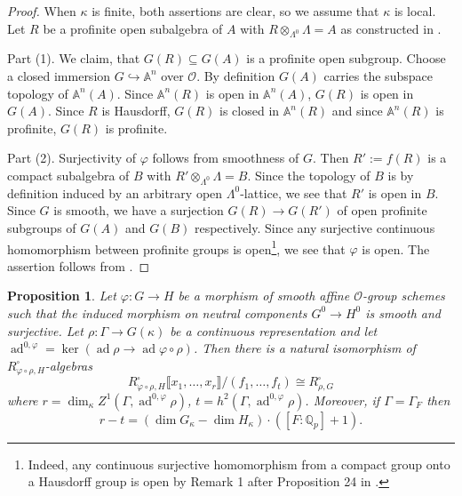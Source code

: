 \documentclass{amsart}
\newtheorem{prop}{Proposition}[section]
\theoremstyle{definition}
\theoremstyle{remark}
\newcommand{\Qp}{\mathbb {Q}_p}
\newcommand{\OO}{\mathcal O}
\DeclareMathOperator{\ad}{ad}
\newcommand{\br}[1]{\llbracket #1\rrbracket}
\begin{document}
\begin{proof} When $\kappa$ is finite, both assertions are clear, so we assume that $\kappa$ is local. Let $R$ be a profinite open subalgebra of $A$ with $R \otimes_{\Lambda^0} \Lambda = A$ as constructed in .

Part (1). We claim, that $G(R) \subseteq G(A)$ is a profinite open subgroup. Choose a closed immersion $G \hookrightarrow \mathbb A^n$ over $\OO$. By definition $G(A)$ carries the subspace topology of $\mathbb A^n(A)$. Since $\mathbb A^n(R)$ is open in $\mathbb A^n(A)$, $G(R)$ is open in $G(A)$. Since $R$ is Hausdorff, $G(R)$ is closed in $\mathbb A^n(R)$ and since $\mathbb A^n(R)$ is profinite, $G(R)$ is profinite.

Part (2). Surjectivity of $\varphi$ follows from smoothness of $G$. Then $R' := f(R)$ is a compact subalgebra of $B$ with $R' \otimes_{\Lambda^0} \Lambda = B$. Since the topology of $B$ is by definition induced by an arbitrary open $\Lambda^0$-lattice, we see that $R'$ is open in $B$. Since $G$ is smooth, we have a surjection $G(R) \to G(R')$ of open profinite subgroups of $G(A)$ and $G(B)$ respectively. Since any surjective continuous homomorphism between profinite groups is open\footnote{Indeed, any continuous surjective homomorphism from a compact group onto a Hausdorff group is open by Remark 1 after Proposition 24 in \cite[Ch.\,III, \S 2, no.\,8]{Bourbaki_top}.}, we see that $\varphi$ is open. The assertion follows from .
\end{proof}

\begin{prop}\label{present_over_RH} Let $\varphi : G \to H$ be a morphism of smooth affine $\OO$-group schemes
such that the induced morphism on neutral components $G^0\rightarrow H^0$ is smooth and surjective.
Let $\rho : \Gamma \to G(\kappa)$ be a continuous representation and let 
$\ad^{0, \varphi}= \ker(\ad \rho\rightarrow \ad \varphi\circ\rho)$.
Then there is a natural  isomorphism of $R^{\square}_{\varphi \circ \rho, H}$-algebras
\begin{equation}\label{eq:present_over_RH}
R^{\square}_{\varphi \circ \rho, H}\br{x_1,\ldots, x_r}/(f_1, \ldots, f_t) \cong R^{\square}_{\rho, G}
\end{equation}
where $r = \dim_{\kappa} Z^1(\Gamma, \ad^{0,\varphi} \rho)$, $t = h^2(\Gamma, \ad^{0,\varphi} \rho)$. 
Moreover, if $\Gamma=\Gamma_F$ then 
\begin{equation}\label{r_minus_t}
r-t = (\dim G_{\kappa} - \dim H_{\kappa}) \cdot ([F : \Qp] + 1).
\end{equation}
\end{prop}
\end{document}
